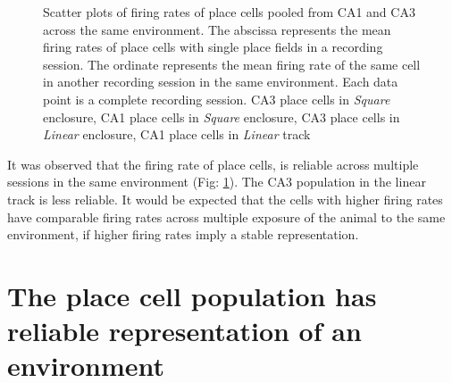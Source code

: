 
\begin{figure}[htb!]
\centering
{}

\caption[Rate remapping]{Scatter plots of firing rates of place cells pooled from CA1 and CA3  across the same environment. The abscissa represents the mean firing rates of place cells with single place fields in a recording session. The ordinate represents the mean firing rate of the same cell in another recording session in the same environment. Each data point is a complete recording session.  CA3 place cells in \emph{Square} enclosure,  CA1 place cells in \emph{Square} enclosure,  CA3 place cells in \emph{Linear} enclosure,  CA1 place cells in \emph{Linear} track}
\label{fig:rateremapping}
\end{figure}





It was observed that the firing rate of place cells, is reliable across multiple sessions in the same environment (Fig:  \ref{fig:rateremapping}). The CA3 population in the linear track is less reliable. It would be expected that the cells with higher firing rates have comparable firing rates across multiple exposure of the animal to the same environment, if higher firing rates imply a stable representation. \\



\section[Population activity within a fixed environment]{The place cell population has reliable representation of an environment}

